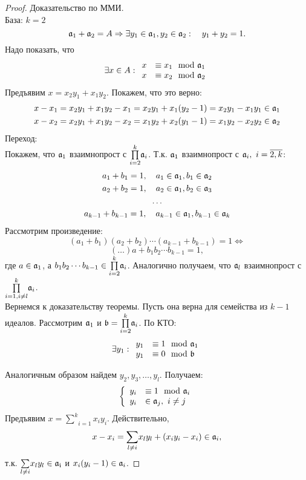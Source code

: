 \begin{proof}
Доказательство по ММИ.\\
База: $k = 2$
\[\mathfrak{a}_1 + \mathfrak{a}_2 = A \Rightarrow \exists y_1 \in \mathfrak{a}_1, y_2 \in \mathfrak{a}_2:~~~y_1 + y_2 = 1.\]
Надо показать, что
\[\exists x \in A: \begin{array}{l l}
                   x & \equiv x_1 \mod \Id{a}_1 \\
                   x & \equiv x_2 \mod \Id{a}_2 \\
                   \end{array}
\]
Предъявим $x = x_2y_1 + x_1y_2$. Покажем, что это верно:
\begin{gather}
x - x_1 = x_2y_1 + x_1y_2 - x_1 = x_2y_1 + x_1(y_2 - 1) = x_2y_1 - x_1y_1 \in \mathfrak{a}_1 \notag \\
x - x_2 = x_2y_1 + x_1y_2 - x_2 = x_1y_2 + x_2(y_1 - 1) = x_1y_2 - x_2y_2 \in \mathfrak{a}_2 \notag
\end{gather}
Переход:\\
Покажем, что $\mathfrak{a}_1$ взаимнопрост с $\underset{i = 2}{\overset{k}\prod}\mathfrak{a}_i$. Т.к. $\mathfrak{a}_1$ взаимнопрост с
$\mathfrak{a}_i,~i=\overline{2,k}$:
\begin{gather}
a_1 + b_1 = 1, ~~~a_1 \in \mathfrak{a}_1, b_1 \in \mathfrak{a}_2 \notag \\
a_2 + b_2 = 1, ~~~a_2 \in \mathfrak{a}_1, b_2 \in \mathfrak{a}_3 \notag \\
\dots \notag \\
a_{k-1} + b_{k-1} = 1, ~~~a_{k-1} \in \mathfrak{a}_1, b_{k-1} \in \mathfrak{a}_k \notag
\end{gather}
Рассмотрим произведение:
\[(a_1 + b_1)(a_2 + b_2)\cdots(a_{k-1} + b_{k-1}) = 1 \Leftrightarrow\] 
\[(\dots)a + b_1b_2 \cdots b_{k-1} = 1,\]
где $a \in \mathfrak{a}_1$, а $b_1b_2 \cdots b_{k-1} \in \underset{i = 2}{\overset{k}\prod}\mathfrak{a}_i$.
Аналогично получаем, что $\mathfrak{a}_l$ взаимнопрост с $\underset{i = 1, i \neq l}{\overset{k}\prod}\mathfrak{a}_i$.\\
Вернемся к доказательству теоремы. Пусть она верна для семейства из $k - 1$ идеалов.
Рассмотрим $\mathfrak{a}_1$ и $\mathfrak{b} = \underset{i = 2}{\overset{k}\prod}\mathfrak{a}_i$. По КТО:
\[
\exists y_1: \begin{array}{l l}
              y_1 & \equiv 1 \mod \Id{a}_1 \\
              y_1 & \equiv 0 \mod \Id{b} \\
             \end{array}
\]

Аналогичным образом найдем $y_2, y_3, \dots, y_l$. Получаем:
\[
\left\{ 
\begin{array}{l l}
  y_i & \equiv 1 \mod \Id{a}_i \\
  y_i & \in \Id{a}_j, ~i \neq j\\
\end{array} \right.
\]
Предъявим $x = \underset{i = 1}{\overset{k}\sum}x_iy_i$. Действительно,
\[x - x_i = \underset{l \neq i}\sum x_ly_l + (x_iy_i - x_i) \in \mathfrak{a}_i,\]
т.к. $\underset{l \neq i}\sum x_ly_l \in \mathfrak{a_i}$ и $x_i(y_i - 1) \in \mathfrak{a}_i$.
\end{proof}

